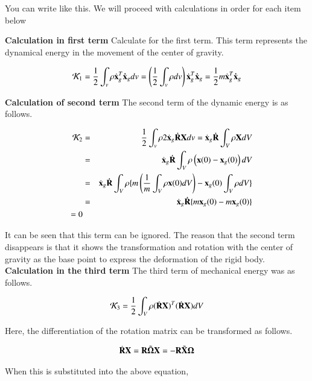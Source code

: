 You can write like this. We will proceed with calculations in order for each item below \ \

\textbf{ Calculation in first term} 
%
Calculate for the first term. This term represents the dynamical energy in the movement of the center of gravity.

\begin{equation}
{\cal K}_1 = \frac{1}{2}\int_v\rho \dot{\mathbf{x}}_g^T\mathbf{\dot{x}}_g dv = \left(\frac{1}{2}\int_v\rho dv\right)\dot{\mathbf{x}}_g^T\mathbf{\dot{x}}_g  = \frac{1}{2}m \dot{\mathbf{x}}_g^T\mathbf{\dot{x}}_g
\end{equation}

\textbf{Calculation of second term} 
%
The second term of the dynamic energy is as follows.

\begin{eqnarray}
{\cal K}_2
&=& \frac{1}{2}\int_v\rho 2\dot{\mathbf{x}}_g\mathbf{\dot{R}}\mathbf{X} dv = \dot{\mathbf{x}}_g\mathbf{\dot{R}}\int_V\rho \mathbf{X} dV\\
&=& \dot{\mathbf{x}}_g\mathbf{\dot{R}}\int_V\rho\left(\mathbf{x}(0)-\mathbf{x}_g(0)\right)dV\\
&=& \dot{\mathbf{x}}_g\mathbf{\dot{R}}\int_V\rho\{m\left(\frac{1}{m}\int_V\rho\mathbf{x}(0)dV\right)-\mathbf{x}_g(0)\int_V\rho dV\} \\
&=& \dot{\mathbf{x}}_g\mathbf{\dot{R}}\{m\mathbf{x}_g(0)-m\mathbf{x}_g(0)\}\\\;\;\;\; = 0
\end{eqnarray}

It can be seen that this term can be ignored. The reason that the second term disappears is that it shows the transformation and rotation with the center of gravity as the base point to express the deformation of the rigid body. \\

\textbf{Calculation in the third term} 
The third term of mechanical energy was as follows.

\begin{equation}
{\cal K}_3 = \frac{1}{2}\int_V\rho(\dot{\mathbf{R}}\mathbf{X})^T(\dot{\mathbf{R}}\mathbf{X})dV
\end{equation}

Here, the differentiation of the rotation matrix can be transformed as follows.

\begin{equation}
\dot{\mathbf{R}}\mathbf{X} = \mathbf{R}\tilde{\mathbf{\Omega}}\mathbf{X} = -\mathbf{R}\tilde{\mathbf{X}}\mathbf{\Omega}
\end{equation}

When this is substituted into the above equation,

